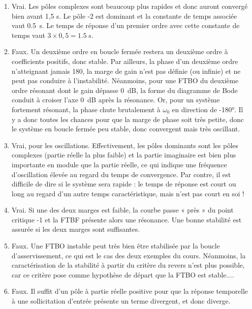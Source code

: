 \documentclass[10pt,fleqn]{article} %
\begin{document}
\ifprof
\begin{corrige}
\begin{enumerate}
\item Vrai. Les pôles complexes sont beaucoup plus rapides et donc auront convergé bien avant
1,5 s. Le pôle -2 est dominant et la constante de temps associée vaut \SI{0,5}{s}. Le temps de réponse
d’un premier ordre avec cette constante de temps vaut $3\times0,5 = \SI{1,5}{s}$.
\item Faux. Un deuxième ordre en boucle fermée restera un deuxième ordre à coefficients positifs,
donc stable. Par ailleurs, la phase d’un deuxième ordre n’atteignant jamais 180\degres, la marge de gain
n’est pas définie (ou infinie) et ne peut pas conduire à l’instabilité. Néanmoins, pour une FTBO
du deuxième ordre résonant dont le gain dépasse \SI{0}{dB}, la forme du diagramme de Bode conduit
à croiser l’axe \SI{0}{dB} après la résonance. Or, pour un système fortement résonant, la phase chute
brutalement à $\omega_0$ en direction de -180°. Il y a donc toutes les chances pour que la marge de phase
soit très petite, donc le système en boucle fermée peu stable, donc convergent mais très oscillant.
\item Vrai, pour les oscillations. Effectivement, les pôles dominants sont les pôles complexes (partie
réelle la plus faible) et la partie imaginaire est bien plus importante en module que la partie réelle,
ce qui indique une fréquence d’oscillation élevée au regard du temps de convergence. Par contre,
il est difficile de dire si le système sera rapide : le temps de réponse est court ou long au regard
d’un autre temps caractéristique, mais n’est pas court en soi !
\item Vrai. Si une des deux marges est faible, la courbe passe « près » du point critique -1 et la FTBF
présente alors une résonance. Une bonne stabilité est assurée si les deux marges sont suffisantes.
\item Faux. Une FTBO instable peut très bien être stabilisée par la boucle d’asservissement, ce qui
est le cas des deux exemples du cours. Néanmoins, la caractérisation de la
stabilité à partir du critère du revers n’est plus possible, car ce critère pose comme hypothèse de
départ que la FTBO est stable.... 
\item Faux. Il suffit d’un pôle à partie réelle positive pour que la réponse temporelle à une sollicitation
d’entrée présente un terme divergent, et donc diverge.
\end{enumerate}
\end{corrige}
\else
\fi
\end{document}
